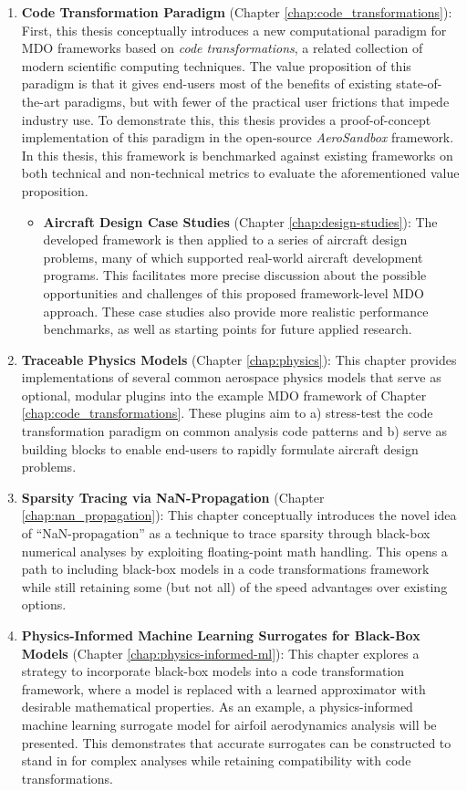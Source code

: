 \begin{enumerate}
    \item \textbf{Code Transformation Paradigm} (Chapter \ref{chap:code_transformations}): First, this thesis conceptually introduces a new computational paradigm for MDO frameworks based on \emph{code transformations}, a related collection of modern scientific computing techniques. The value proposition of this paradigm is that it gives end-users most of the benefits of existing state-of-the-art paradigms, but with fewer of the practical user frictions that impede industry use. To demonstrate this, this thesis provides a proof-of-concept implementation of this paradigm in the open-source \textit{AeroSandbox} \cite{asb_github, sharpe_aerosandbox_2021} framework. In this thesis, this framework is benchmarked against existing frameworks on both technical and non-technical metrics to evaluate the aforementioned value proposition.
    \begin{itemize}
    \item \textbf{Aircraft Design Case Studies} (Chapter \ref{chap:design-studies}): The developed framework is then applied to a series of aircraft design problems, many of which supported real-world aircraft development programs. This facilitates more precise discussion about the possible opportunities and challenges of this proposed framework-level MDO approach. These case studies also provide more realistic performance benchmarks, as well as starting points for future applied research.
    \end{itemize}
    \item \textbf{Traceable Physics Models} (Chapter \ref{chap:physics}): This chapter provides implementations of several common aerospace physics models that serve as optional, modular plugins into the example MDO framework of Chapter \ref{chap:code_transformations}. These plugins aim to a) stress-test the code transformation paradigm on common analysis code patterns and b) serve as building blocks to enable end-users to rapidly formulate aircraft design problems.
    \item \textbf{Sparsity Tracing via NaN-Propagation} (Chapter \ref{chap:nan_propagation}): This chapter conceptually introduces the novel idea of ``NaN-propagation'' as a technique to trace sparsity through black-box numerical analyses by exploiting floating-point math handling. This opens a path to including black-box models in a code transformations framework while still retaining some (but not all) of the speed advantages over existing options.
    \item \textbf{Physics-Informed Machine Learning Surrogates for Black-Box Models} (Chapter \ref{chap:physics-informed-ml}): This chapter explores a strategy to incorporate black-box models into a code transformation framework, where a model is replaced with a learned approximator with desirable mathematical properties. As an example, a physics-informed machine learning surrogate model for airfoil aerodynamics analysis will be presented. This demonstrates that accurate surrogates can be constructed to stand in for complex analyses while retaining compatibility with code transformations.

\end{enumerate}
